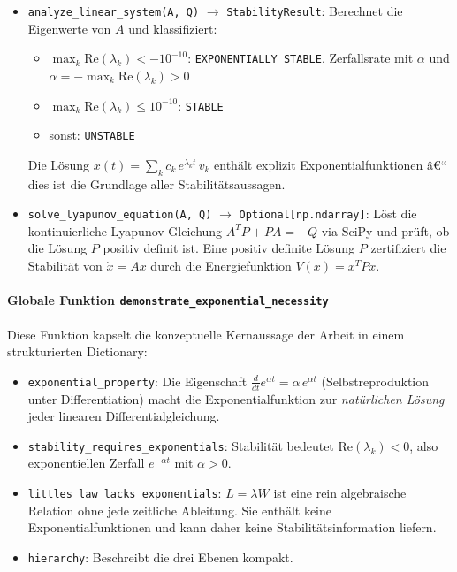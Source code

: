 ﻿\documentclass[a4paper,12pt]{scrreprt}
\theoremstyle{definition}
\begin{document}
\begin{itemize}
	\item \texttt{analyze\_linear\_system(A, Q)} $\to$
	\texttt{StabilityResult}:  Berechnet die Eigenwerte von $A$
	und klassifiziert:
	\begin{itemize}
		\item $\max_k \text{Re}(\lambda_k) < -10^{-10}$:
		\texttt{EXPONENTIALLY\_STABLE}, Zerfallsrate mit $\alpha$ und
		$\alpha = -\max_k \text{Re}(\lambda_k) > 0$
		\item $\max_k \text{Re}(\lambda_k) \leq 10^{-10}$:
		\texttt{STABLE}
		\item sonst: \texttt{UNSTABLE}
	\end{itemize}
	Die Lösung $x(t) = \sum_k c_k\, e^{\lambda_k t}\, v_k$
	enthält explizit Exponentialfunktionen â€“ dies ist die
	Grundlage aller Stabilitätsaussagen.
	
	\item \texttt{solve\_lyapunov\_equation(A, Q)} $\to$
	\texttt{Optional[np.ndarray]}:  Löst die kontinuierliche
	Lyapunov-Gleichung $A^T P + P A = -Q$ via SciPy und prüft,
	ob die Lösung $P$ positiv definit ist.  Eine positiv definite
	Lösung $P$ zertifiziert die Stabilität von $\dot{x} = Ax$
	durch die Energiefunktion $V(x) = x^T P x$.
\end{itemize}

\paragraph{Globale Funktion \texttt{demonstrate\_exponential\_necessity}}

Diese Funktion kapselt die konzeptuelle Kernaussage der Arbeit in
einem strukturierten Dictionary:

\begin{itemize}
	\item \texttt{exponential\_property}: Die Eigenschaft
	$\frac{d}{dt}e^{\alpha t} = \alpha\,e^{\alpha t}$
	(Selbstreproduktion unter Differentiation) macht die
	Exponentialfunktion zur \emph{natürlichen Lösung} jeder
	linearen Differentialgleichung.
	\item \texttt{stability\_requires\_exponentials}: Stabilität
	bedeutet $\text{Re}(\lambda_k) < 0$, also exponentiellen
	Zerfall $e^{-\alpha t}$ mit $\alpha > 0$.
	\item \texttt{littles\_law\_lacks\_exponentials}: $L = \lambda W$
	ist eine rein algebraische Relation ohne jede zeitliche
	Ableitung.  Sie enthält keine Exponentialfunktionen und
	kann daher keine Stabilitätsinformation liefern.
	\item \texttt{hierarchy}: Beschreibt die drei Ebenen kompakt.
\end{itemize}
\end{document}
